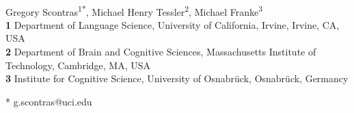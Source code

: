 \documentclass[10pt,letterpaper]{article}
\begin{document}
\vspace*{0.2in}

\begin{flushleft}
{\Large
\textbf{} %
}
\newline
\\
Gregory Scontras\textsuperscript{1*},
Michael Henry Tessler\textsuperscript{2},
Michael Franke\textsuperscript{3}
\\
\bigskip
\textbf{1} Department of Language Science, University of California, Irvine, Irvine, CA, USA
\\
\textbf{2} Department of Brain and Cognitive Sciences, Massachusetts Institute of Technology, Cambridge, MA, USA
\\
\textbf{3} Institute for Cognitive Science, University of Osnabr\"{u}ck, Osnabr\"{u}ck, Germancy
\\
\bigskip

% 
%





* g.scontras@uci.edu

\end{flushleft}
\end{document}
